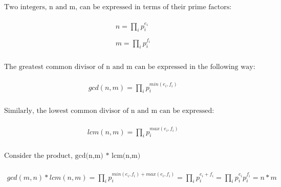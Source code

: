 $\textrm{Two integers, n and m, can be expressed in terms of their prime factors:}$ \\ \\
\begin{gather*}
n = \prod_{i}p_i^{e_i} \\ \\
m = \prod_{i}p_i^{f_i} \\ \\
\end{gather*}

$\textrm{The greatest common divisor of n and m can be expressed in the following way: }$ \\ \\
\begin{gather*}
gcd(n,m) = \prod_{i}p_i^{min(e_i, f_i)} \\ \\
\end{gather*}

$\textrm{Similarly, the lowest common divisor of n and m can be expressed: }$ \\ \\
\begin{gather*}
lcm(n,m) = \prod_{i}p_i^{max(e_i, f_i)} \\ \\
\end{gather*}

$\textrm{Consider the product, gcd(n,m) * lcm(n,m) }$ \\ \\
\begin{gather*}
gcd(m,n) * lcm(n,m) = \prod_{i}p_i^{min(e_i, f_i) + max(e_i, f_i)} 
 = \prod_{i}p_i^{e_i + f_i}
 = \prod_{i}p_i^{e_i}p_i^{f_i} = n * m\\ \\
\end{gather*}

